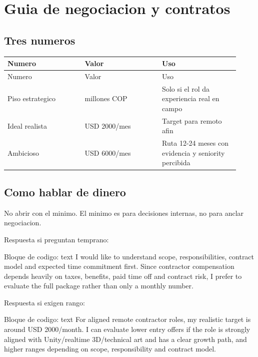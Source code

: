 \chapter{Guia de negociacion y contratos}

\section{Tres numeros}


\begin{center}
\scriptsize
\begin{longtable}{>{\raggedright\arraybackslash}p{0.305\linewidth} >{\raggedright\arraybackslash}p{0.305\linewidth} >{\raggedright\arraybackslash}p{0.305\linewidth}}
\toprule
Numero & Valor & Uso \\
\midrule
\endfirsthead
\toprule
Numero & Valor & Uso \\
\midrule
\endhead
Piso estrategico & 3 millones COP & Solo si el rol da experiencia real en campo \\
Ideal realista & USD 2000/mes & Target para remoto afin \\
Ambicioso & USD 6000/mes & Ruta 12-24 meses con evidencia y seniority percibida \\
\bottomrule
\end{longtable}
\end{center}



\section{Como hablar de dinero}


No abrir con el minimo. El minimo es para decisiones internas, no para anclar negociacion.


Respuesta si preguntan temprano:


\begin{mdcode}
Bloque de codigo: text
I would like to understand scope, responsibilities, contract model and expected time commitment first. Since contractor compensation depends heavily on taxes, benefits, paid time off and contract risk, I prefer to evaluate the full package rather than only a monthly number.
\end{mdcode}


Respuesta si exigen rango:


\begin{mdcode}
Bloque de codigo: text
For aligned remote contractor roles, my realistic target is around USD 2000/month. I can evaluate lower entry offers if the role is strongly aligned with Unity/realtime 3D/technical art and has a clear growth path, and higher ranges depending on scope, responsibility and contract model.
\end{mdcode}


